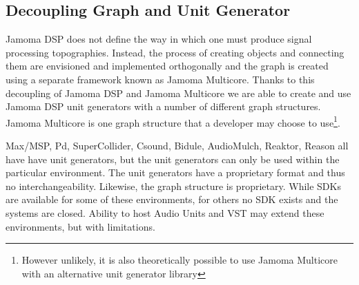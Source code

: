 \documentclass[twoside,a4paper]{article}
\begin{document}

\subsection{Decoupling Graph and Unit Generator} %

Jamoma DSP does not define the way in which one must produce signal processing topographies.  
Instead, the process of creating objects and connecting them are envisioned and implemented orthogonally and the graph is created using a separate framework known as Jamoma Multicore.  
Thanks to this decoupling of Jamoma DSP and Jamoma Multicore we are able to create and use Jamoma DSP unit generators with a number of different graph structures.  
Jamoma Multicore is one graph structure that a developer may choose to use\footnote{However unlikely, it is also theoretically possible to use Jamoma Multicore with an alternative unit generator library}.

Max/MSP, Pd, SuperCollider, Csound, Bidule, AudioMulch, Reaktor, Reason all have have unit generators, but the unit generators can only be used within the particular environment. 
The unit generators have a proprietary format and thus no interchangeability.  Likewise, the graph structure is proprietary. 
While SDKs are available for some of these environments, for others no SDK exists and the systems are closed. 
Ability to host Audio Units and VST may extend these environments, but with limitations.
\end{document}
